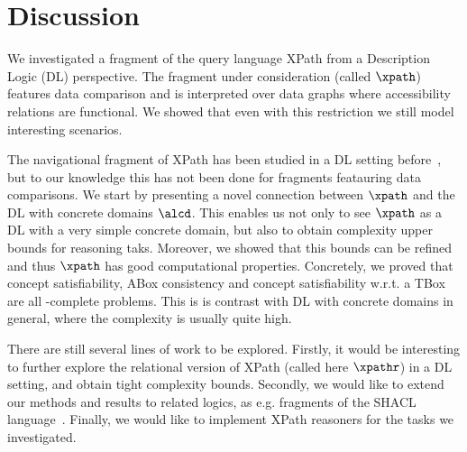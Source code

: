 \section{Discussion}
\label{sec:final}

We investigated a fragment of the query language XPath from a Description Logic (DL) perspective. 
The fragment under consideration (called $\xpath$) features data comparison and is interpreted over data graphs where accessibility relations are functional. We showed that even with this restriction we still model interesting scenarios. 

The navigational fragment of XPath has been studied in a DL setting before~\cite{KostylevRV14,Kost:xpat15}, but to our knowledge this has not been done for fragments featauring data comparisons. We start by presenting a novel connection between $\xpath$ and the DL with concrete domains $\alcd$. This enables us not only to see $\xpath$ as a DL with a very simple concrete domain, but also to obtain complexity upper bounds for reasoning taks. Moreover, we showed that this bounds can be refined and thus $\xpath$ has good computational properties. Concretely, we proved that concept satisfiability, ABox consistency and concept satisfiability w.r.t. a TBox are all \np-complete problems. This is is contrast with DL with concrete domains in general, where the complexity is usually quite high. 

There are still several lines of work to be explored. Firstly, it would be interesting to further explore the relational version of XPath (called here $\xpathr$) in a DL setting, and obtain tight complexity bounds. Secondly, we would like to extend our methods and results to related logics, as e.g. fragments of the SHACL language~\cite{Ortiz23,Ahmetaj0S23}. Finally, we would like to implement XPath reasoners for the tasks we investigated.